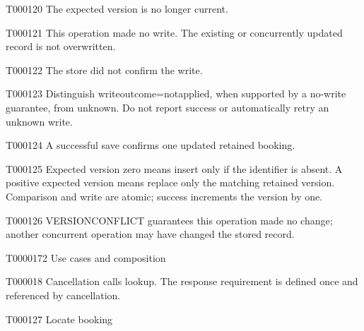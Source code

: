 \documentclass[11pt,a4paper]{article}
\begin{document}
\begin{atlasparagraph}{T000120}
The expected version is no longer current.
\end{atlasparagraph}
\begin{atlasparagraph}{T000121}
This operation made no write. The existing or concurrently updated record is not overwritten.
\end{atlasparagraph}
\begin{atlasparagraph}{T000122}
The store did not confirm the write.
\end{atlasparagraph}
\begin{atlasparagraph}{T000123}
Distinguish write\AtlasCharUnderscore{}outcome=not\AtlasCharUnderscore{}applied, when supported by a no-write guarantee, from unknown. Do not report success or automatically retry an unknown write.
\end{atlasparagraph}
\begin{atlasparagraph}{T000124}
A successful save confirms one updated retained booking.
\end{atlasparagraph}
\begin{atlasparagraph}{T000125}
Expected version zero means insert only if the identifier is absent. A positive expected version means replace only the matching retained version. Comparison and write are atomic; success increments the version by one.
\end{atlasparagraph}
\begin{atlasparagraph}{T000126}
VERSION\AtlasCharUnderscore{}CONFLICT guarantees this operation made no change; another concurrent operation may have changed the stored record.
\end{atlasparagraph}
\begin{atlasheading}{T000017}{2}
Use cases and composition
\end{atlasheading}
\begin{atlasparagraph}{T000018}
Cancellation calls lookup. The response requirement is defined once and referenced by cancellation.
\end{atlasparagraph}
\begin{atlastext}{T000127}
Locate booking
\end{atlastext}
\end{document}
